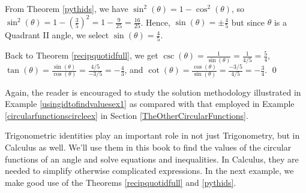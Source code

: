 \documentclass{ximera}
\begin{document}
\begin{example}
\begin{enumerate}
\smallskip

 From Theorem \ref{pythids}, we  have $\sin^{2}(\theta) = 1 - \cos^{2}(\theta)$,  so $\sin^{2}(\theta) = 1 - \left(\frac{3}{5}\right)^2 = 1 - \frac{9}{25} = \frac{16}{25}$.  Hence,  $\sin(\theta) = \pm \frac{4}{5}$ but since $\theta$ is a Quadrant II angle, we select $\sin(\theta) = \frac{4}{5}$.
 
 \smallskip
 
Back to  Theorem \ref{recipquotidfull}, we get $\csc(\theta) = \frac{1}{\sin(\theta)} = \frac{1}{4/5} = \frac{5}{4}$, $\tan(\theta) = \frac{\sin(\theta)}{\cos(\theta)} = \frac{4/5}{-3/5} = -\frac{4}{3}$, and $\cot(\theta) = \frac{\cos(\theta)}{\sin(\theta)} = \frac{-3/5}{4/5} = -\frac{3}{4}$.  \qed 


\end{enumerate}



\end{example}


\smallskip

Again, the reader is encouraged to study the solution methodology illustrated in  Example \ref{usingidtofindvaluesex1} as compared with that employed in Example \ref{circularfunctionscircleex} in Section \ref{TheOtherCircularFunctions}.

\smallskip

Trigonometric identities play an important role in not just Trigonometry, but in Calculus as well.  We'll use them in this book to find the values of the circular functions of an angle and solve equations and inequalities.  In Calculus, they are needed to simplify otherwise complicated expressions.  In the next example, we make good use of the Theorems \ref{recipquotidfull} and \ref{pythids}.
\end{document}
